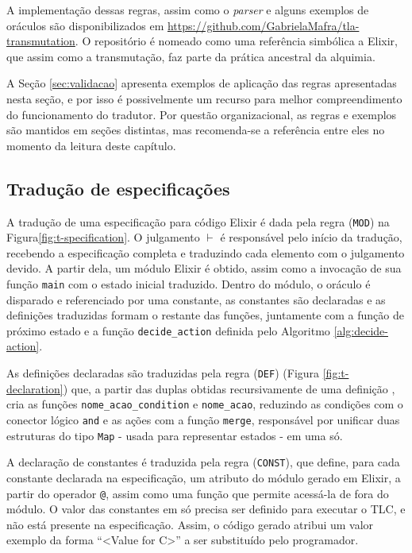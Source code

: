 A implementação dessas regras, assim como o \textit{parser} e alguns exemplos de
oráculos são disponibilizados em
\url{https://github.com/GabrielaMafra/tla-transmutation}. O repositório é
nomeado como uma referência simbólica a Elixir, que assim como a transmutação,
faz parte da prática ancestral da alquimia.

A Seção \ref{sec:validacao} apresenta exemplos de aplicação das regras
apresentadas nesta seção, e por isso é possivelmente um recurso para melhor
compreendimento do funcionamento do tradutor. Por questão organizacional, as
regras e exemplos são mantidos em seções distintas, mas recomenda-se a
referência entre eles no momento da leitura deste capítulo.

\subsection{Tradução de especificações}



A tradução de uma especificação para código Elixir é dada pela regra
(\texttt{MOD}) na Figura\ref{fig:t-specification}.
O julgamento $\vdash$ é responsável pelo início da tradução, recebendo a
especificação completa e traduzindo cada elemento com o julgamento devido.
A partir dela, um módulo Elixir é obtido, assim como a invocação de sua
função \texttt{main} com o estado inicial traduzido. Dentro do módulo, o oráculo
é disparado e referenciado por uma constante, as constantes são declaradas e as
definições traduzidas formam o restante das funções, juntamente com a função de
próximo estado e a função \texttt{decide\_action} definida pelo Algoritmo \ref{alg:decide-action}.

As definições declaradas são traduzidas pela regra (\texttt{DEF}) (Figura
\ref{fig:t-declaration}) que, a partir das duplas
obtidas recursivamente de uma definição \FANCYA, cria as funções \texttt{nome\_acao\_condition} 
e \texttt{nome\_acao}, reduzindo as condições com o conector lógico \texttt{and}
e as ações com a função \texttt{merge}, responsável por unificar duas
estruturas do tipo \texttt{Map} - usada para representar estados - em uma só.

A declaração de constantes é traduzida pela regra (\texttt{CONST}), que define,
para cada constante declarada na especificação, um atributo do módulo gerado em
Elixir, a partir do operador \texttt{@}, assim como uma função que permite acessá-la de
fora do módulo. O valor das constantes em \TLA só precisa ser definido para
executar o TLC, e não está presente na especificação. Assim, o código gerado
atribui um valor exemplo da forma ``<Value for C>'' a ser substituído pelo programador.



